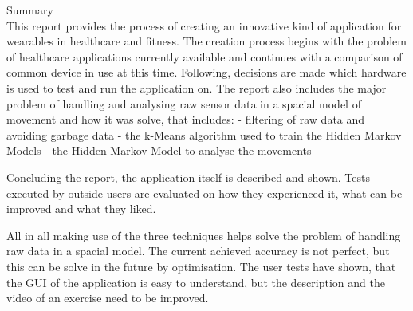 \hfill{\Huge Summary}\\

This report provides the process of creating an innovative kind of application for wearables in healthcare and fitness.
The creation process begins with the problem of healthcare applications currently available and continues with a comparison of common device in use at this time. Following, decisions are made which hardware is used to test and run the application on. \newline
The report also includes the major problem of handling and analysing raw sensor data in a spacial model of movement and how it was solve, that includes: \newline
- filtering of raw data and avoiding garbage data \newline
- the k-Means algorithm used to train the Hidden Markov Models \newline
- the Hidden Markov Model to analyse the movements
\newline

Concluding the report, the application itself is described and shown. Tests executed by outside users are evaluated on how they experienced it, what can be improved and what they liked.
\newline

All in all making use of the three techniques helps solve the problem of handling raw data in a spacial model. The current achieved accuracy is not perfect, but this can be solve in the future by optimisation.
The user tests have shown, that the GUI of the application is easy to understand, but the description and the video of an exercise need to be improved.